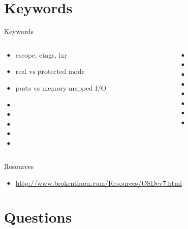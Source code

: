 \documentclass{workshop}
\begin{document}
\section{Keywords}

\begin{frame}{Keywords}
  \begin{columns}
    \begin{column}[l]{0.5\textwidth}
      \begin{itemize}
        \item cscope, ctags, lxr
        \item real vs protected mode
        \item ports vs memory mapped I/O
        \item 
        \item 
        \item 
        \item 
        \item 
      \end{itemize}
    \end{column}
    \begin{column}[l]{0.5\textwidth}
      \begin{itemize}
        \item 
        \item 
        \item 
        \item 
        \item 
        \item 
        \item 
        \item 
      \end{itemize}
    \end{column}
  \end{columns}
\end{frame}

\begin{frame}{Resources}
  \begin{itemize}
    \item \url{http://www.brokenthorn.com/Resources/OSDev7.html}
  \end{itemize}
\end{frame}

\section{Questions}
\end{document}
